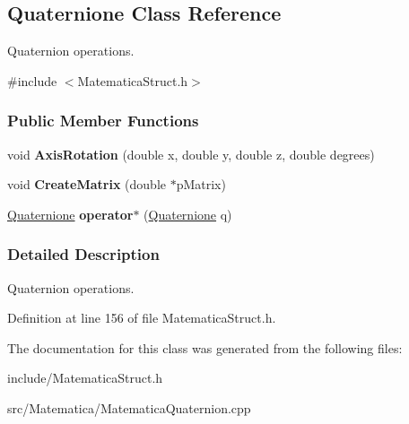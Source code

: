 \hypertarget{classQuaternione}{\subsection{\-Quaternione \-Class \-Reference}
\label{classQuaternione}
}


\-Quaternion operations.  




{\ttfamily \#include $<$\-Matematica\-Struct.\-h$>$}

\subsubsection*{\-Public \-Member \-Functions}
\begin{DoxyCompactItemize}
\item 
\hypertarget{classQuaternione_a3043a01aeeb6b09cd468596764985612}{void {\bfseries \-Axis\-Rotation} (double x, double y, double z, double degrees)}\label{classQuaternione_a3043a01aeeb6b09cd468596764985612}

\item 
\hypertarget{classQuaternione_ab75ed463292c44f80327654feef432dd}{void {\bfseries \-Create\-Matrix} (double $\ast$p\-Matrix)}\label{classQuaternione_ab75ed463292c44f80327654feef432dd}

\item 
\hypertarget{classQuaternione_ab73205322f5dc9e132f593f21249248f}{\hyperlink{classQuaternione}{\-Quaternione} {\bfseries operator$\ast$} (\hyperlink{classQuaternione}{\-Quaternione} q)}\label{classQuaternione_ab73205322f5dc9e132f593f21249248f}

\end{DoxyCompactItemize}


\subsubsection{\-Detailed \-Description}
\-Quaternion operations. 

\-Definition at line 156 of file \-Matematica\-Struct.\-h.



\-The documentation for this class was generated from the following files\-:\begin{DoxyCompactItemize}
\item 
include/\-Matematica\-Struct.\-h\item 
src/\-Matematica/\-Matematica\-Quaternion.\-cpp\end{DoxyCompactItemize}
